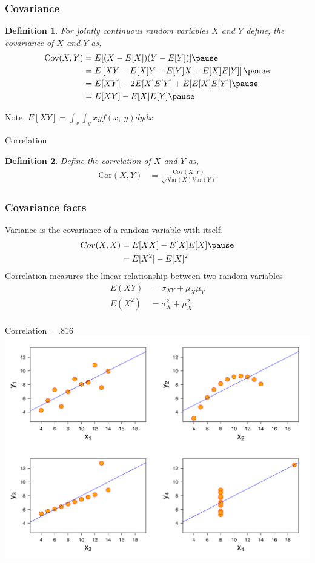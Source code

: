 \documentclass[aspectratio=169, handout]{beamer}
\newtheorem{defn}{Definition}
\numberwithin{equation}{section}
\begin{document}
\begin{frame}
\frametitle{Covariance} 

\begin{defn} 
For jointly continuous random variables $X$ and $Y$ define, the covariance of $X$ and $Y$ as,\pause 
\begin{align*}
\text{Cov}(X,Y) & =  E[(X-E[X])(Y- E[Y])]  \pause  \\
& =  E\left[ XY - E[X] Y - E[Y] X + E[X]E[Y] \right]  \pause  \\
& =  E[XY] - 2E[X]E[Y] + E[E[X]E[Y]]   \pause \\
& =  E[XY] - E[X]E[Y] \pause 
\end{align*}
\end{defn} 
Note, $E[XY]=\int_x\int_y xy f(x,\ y)dy dx$
\end{frame}


\begin{frame}{Correlation}
\begin{defn} 
Define the correlation of $X$ and $Y$ as,  \pause 
\begin{align*}
\text{Cor}(X,Y) & =  \frac{\text{Cov}(X,Y) }{\sqrt{\text{Var}(X) \text{Var}(Y) } }
\end{align*}
\end{defn} 
\end{frame}


\begin{frame}
\frametitle{Covariance facts}

Variance is the covariance of a random variable with itself.\pause 
\begin{align*}
Cov(X,X) & =  E[X X] - E[X]E[X] \pause \\
& =  E[X^2] - E[X]^2
\end{align*}
\pause 
Correlation measures the linear relationship between two random variables\\ 

\begin{align*}
E(XY) & =  \sigma_{XY}+\mu_X\mu_Y  \\
E(X^2) & =  \sigma^2_{X}+\mu^2_X  \\
\end{align*}

\end{frame}


\begin{frame}{Correlation$=.816$}
\includegraphics[width=3.5 in]{images/Anscomb.png}
\end{frame}
\end{document}
